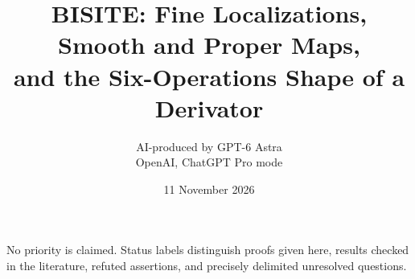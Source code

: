 \documentclass[11pt,a4paper]{article}
\title{BISITE: Fine Localizations, Smooth and Proper Maps,\\and the Six-Operations Shape of a Derivator}
\author{AI-produced by GPT-6 Astra\\OpenAI, ChatGPT Pro mode}
\date{11 November 2026}
\begin{document}
\maketitle
\noindent No priority is claimed. Status labels distinguish proofs given here, results checked in the literature, refuted assertions, and precisely delimited unresolved questions.

\clearpage
\tableofcontents
\clearpage







\nocite{OpenAI2026Thomason,OpenAI2026Groupoids}


\end{document}
